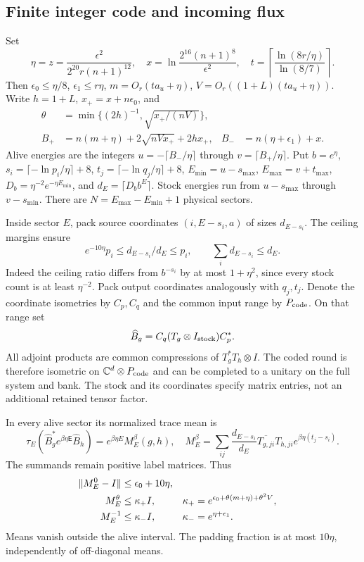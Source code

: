 \subsection{Finite integer code and incoming flux}
Set
\[
 \eta=z=\frac{\epsilon^2}{2^{20}r(n+1)^{12}},\quad
 x=\ln\frac{2^{16}(n+1)^8}{\epsilon^2},\quad
 t=\left\lceil\frac{\ln(8r/\eta)}{\ln(8/7)}\right\rceil.
\]
Then $\epsilon_0\leq\eta/8$, $\epsilon_1\leq r\eta$,
$m=O_r(ta_u+\eta)$, $V=O_r((1+L)(ta_u+\eta))$.
Write $h=1+L$, $x_+=x+n\epsilon_0$, and
\begin{align*}
 \theta&=\min\{(2h)^{-1},\sqrt{x_+/(nV)}\},\\
 B_+&=n(m+\eta)+2\sqrt{nVx_+}+2hx_+,
 &B_-&=n(\eta+\epsilon_1)+x.
\end{align*}
Alive energies are the integers $u=-\lceil B_-/\eta\rceil$
through $v=\lceil B_+/\eta\rceil$. Put $b=e^\eta$,
$s_i=\lceil-\ln p_i/\eta\rceil+8$,
$t_j=\lceil-\ln q_j/\eta\rceil+8$,
$E_{\min}=u-s_{\max}$, $E_{\max}=v+t_{\max}$,
$D_b=\eta^{-2}e^{-\eta E_{\min}}$, and $d_E=\lceil D_b b^E\rceil$.
Stock energies run from $u-s_{\max}$ through $v-s_{\min}$.
There are $N=E_{\max}-E_{\min}+1$ physical sectors.

Inside sector $E$, pack source coordinates $(i,E-s_i,a)$ of sizes
$d_{E-s_i}$. The ceiling margins ensure
\[
 e^{-10\eta}p_i\leq d_{E-s_i}/d_E\leq p_i,
 \qquad \sum_i d_{E-s_i}\leq d_E.
\]
Indeed the ceiling ratio differs from $b^{-s_i}$ by at most
$1+\eta^2$, since every stock count is at least $\eta^{-2}$.
Pack output coordinates analogously with $q_j,t_j$. Denote the
coordinate isometries by $C_p,C_q$ and the common input range by
$P_{\rm code}$. On that range set
\[
 \widehat B_g=C_q(T_g\otimes I_{\rm stock})C_p^*.
\]
All adjoint products are common compressions of $T_g^*T_h\otimes I$.
The coded round is therefore isometric on
$\mathbb C^d\otimes P_{\rm code}$ and can be completed to a unitary
on the full system and bank. The stock and its coordinates specify
matrix entries, not an additional retained tensor factor.

In every alive sector its normalized trace mean is
\[
 \tau_E(\widehat B_g^*e^{\beta\eta\mathsf E}\widehat B_h)
 =e^{\beta\eta E}M_E^\beta(g,h),\quad
 M_E^\beta=\sum_{ij}\frac{d_{E-s_i}}{d_E}
 \overline{T_{g,ji}}T_{h,ji}e^{\beta\eta(t_j-s_i)}.
\]
The summands remain positive label matrices. Thus
\begin{align}\label{eq:coded-matrix-means}
 \|M_E^0-I\|&\leq\epsilon_0+10\eta,\notag\\
 M_E^\theta&\leq\kappa_+I,
 &\kappa_+&=e^{\epsilon_0+\theta(m+\eta)+\theta^2V},\\
 M_E^{-1}&\leq\kappa_-I,
 &\kappa_-&=e^{\eta+\epsilon_1}.\notag
\end{align}
Means vanish outside the alive interval. The padding fraction is at
most $10\eta$, independently of off-diagonal means.

